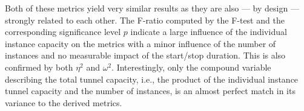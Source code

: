 Both of these metrics yield very similar results as they are also --- by design --- strongly related to each other. The F-ratio computed by the F-test and the corresponding significance level $p$ indicate a large influence of the individual instance capacity on the metrics with a minor influence of the number of instances and no measurable impact of the start/stop duration. This is also confirmed by both $\eta^2$ and $\omega^2$. Interestingly, only the compound variable describing the total tunnel capacity, i.e., the product of the individual instance tunnel capacity and the number of instances, is an almost perfect match in its variance to the derived metrics.











